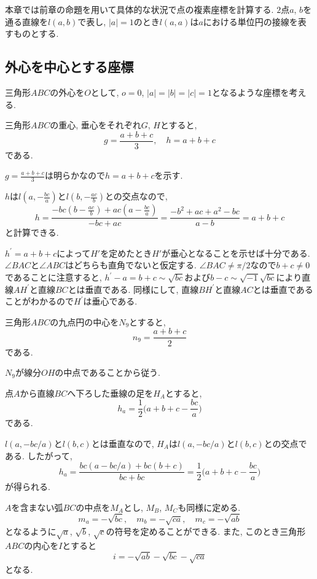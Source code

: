 本章では前章の命題を用いて具体的な状況で点の複素座標を計算する.
$2$点$a$, $b$を通る直線を$l(a,b)$で表し, $\lvert a\rvert=1$のとき$l(a,a)$は$a$における単位円の接線を表すものとする.
\subsection{外心を中心とする座標}
\begin{bset}
三角形$ABC$の外心を$O$として, $o=0$, $\lvert a\rvert=\lvert b\rvert=\lvert c\rvert=1$となるような座標を考える.
\end{bset}
\begin{bthm}
三角形$ABC$の重心, 垂心をそれぞれ$G$, $H$とすると,
\[
g=\frac{a+b+c}{3},\quad h=a+b+c
\]
である.
\end{bthm}
\begin{prf*}
$g=\frac{a+b+c}{3}$は明らかなので$h=a+b+c$を示す.

$h$は$l(a,-\frac{bc}a)$と$l(b,-\frac{ac}b)$との交点なので,
\[h=\frac{-bc(b-\frac{ac}b)+ac(a-\frac{bc}a)}{-bc+ac}=\frac{-b^2+ac+a^2-bc}{a-b}=a+b+c\]
と計算できる.
\end{prf*}
\begin{prff*}
$h^\prime=a+b+c$によって$H'$を定めたとき$H'$が垂心となることを示せば十分である.
$\angle BAC$と$\angle ABC$はどちらも直角でないと仮定する.
$\angle BAC\neq\pi/2$なので$b+c\neq 0$であることに注意すると, $h^\prime-a=b+c\sim\sqrt{bc}$および$b-c\sim\sqrt{-1}\sqrt{bc}$により直線$AH^\prime$と直線$BC$とは垂直である.
同様にして, 直線$BH^\prime$と直線$AC$とは垂直であることがわかるので$H^\prime$は垂心である.
\end{prff*}
%
%
\begin{bthm}
三角形$ABC$の九点円の中心を$N_9$とすると,
\[n_9=\frac{a+b+c}2\]
である.
\end{bthm}
\begin{prf*}
$N_9$が線分$OH$の中点であることから従う.
\end{prf*}
%
%
\begin{bthm}
点$A$から直線$BC$へ下ろした垂線の足を$H_A$とすると,
\[
h_a=\frac 12\biggl(a+b+c-\frac{bc}a\biggr)
\]
である.
\end{bthm}
\begin{prf*}
$l(a,-bc/a)$と$l(b,c)$とは垂直なので, $H_A$は$l(a,-bc/a)$と$l(b,c)$との交点である.
したがって,
\[h_a=\frac{bc(a-bc/a)+bc(b+c)}{bc+bc}=\frac 12\biggl(a+b+c-\frac{bc}a\biggr)\]
が得られる.
\end{prf*}
%
%
\begin{bthm}\label{thm:incenter-o}
$A$を含まない弧$BC$の中点を$M_A$とし, $M_B$, $M_C$も同様に定める.
\[m_a=-\sqrt{bc},\quad m_b=-\sqrt{ca},\quad m_c=-\sqrt{ab}\]
となるように$\sqrt a$, $\sqrt b$, $\sqrt c$の符号を定めることができる.
また, このとき三角形$ABC$の内心を$I$とすると
\[i=-\sqrt{ab}-\sqrt{bc}-\sqrt{ca}\]
となる.
\end{bthm}
